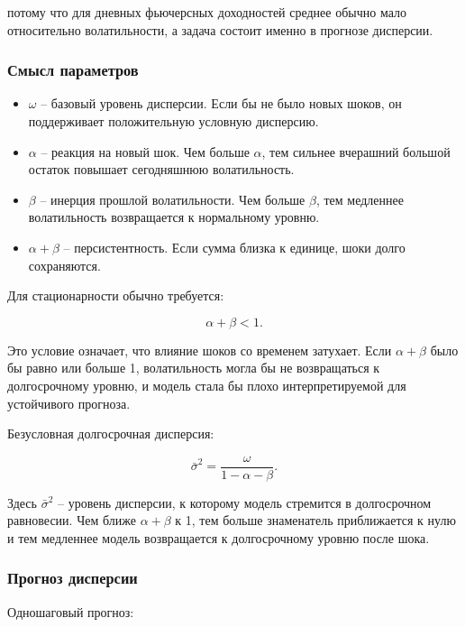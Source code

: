 \documentclass[11pt,a4paper]{article}
\begin{document}
потому что для дневных фьючерсных доходностей среднее обычно мало относительно волатильности, а задача состоит именно в прогнозе дисперсии.

\subsubsection{Смысл параметров}

\begin{itemize}
    \item $\omega$ -- базовый уровень дисперсии. Если бы не было новых шоков, он поддерживает положительную условную дисперсию.
    \item $\alpha$ -- реакция на новый шок. Чем больше $\alpha$, тем сильнее вчерашний большой остаток повышает сегодняшнюю волатильность.
    \item $\beta$ -- инерция прошлой волатильности. Чем больше $\beta$, тем медленнее волатильность возвращается к нормальному уровню.
    \item $\alpha+\beta$ -- персистентность. Если сумма близка к единице, шоки долго сохраняются.
\end{itemize}

Для стационарности обычно требуется:

\begin{equation}
\alpha+\beta<1.
\end{equation}

Это условие означает, что влияние шоков со временем затухает. Если $\alpha+\beta$ было бы равно или больше 1, волатильность могла бы не возвращаться к долгосрочному уровню, и модель стала бы плохо интерпретируемой для устойчивого прогноза.

Безусловная долгосрочная дисперсия:

\begin{equation}
\bar{\sigma}^2 =
\frac{\omega}{1-\alpha-\beta}.
\end{equation}

Здесь $\bar{\sigma}^2$ -- уровень дисперсии, к которому модель стремится в долгосрочном равновесии. Чем ближе $\alpha+\beta$ к 1, тем больше знаменатель приближается к нулю и тем медленнее модель возвращается к долгосрочному уровню после шока.

\subsubsection{Прогноз дисперсии}

Одношаговый прогноз:
\end{document}
